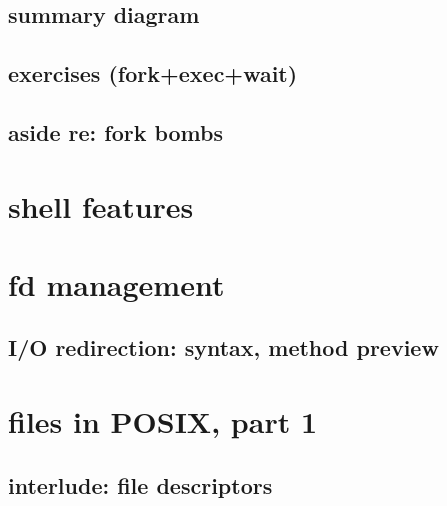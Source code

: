



\subsection{summary diagram}




\subsection{exercises (fork+exec+wait)}



\subsection{aside re: fork bombs}



\section{shell features}


\section{fd management}
\subsection{I/O redirection: syntax, method preview}



\section{files in POSIX, part 1}

\subsection{interlude: file descriptors}





